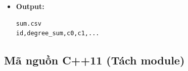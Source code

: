 \begin{itemize}
\begin{itemize}
        \item \textbf{Module 4 (Ghi file):}
        \begin{itemize}
            \item Ghi ra \texttt{sum.csv}
            \item Định dạng:
            \texttt{id,degree\_sum,c0..cm}
        \end{itemize}
    \end{itemize}

    \item \textbf{Output:}
\begin{lstlisting}
sum.csv
id,degree_sum,c0,c1,...
\end{lstlisting}
\end{itemize}

\subsection{Mã nguồn C++11 (Tách module)}
